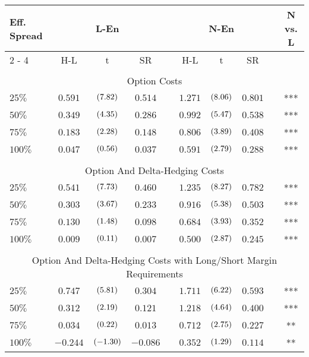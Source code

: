 \begin{tabular}{@{}lccccccccc@{}}%
\toprule%
Eff. Spread&\multicolumn{3}{c}{L{-}En}&&\multicolumn{3}{c}{N{-}En}&&N vs. L\\%
\cmidrule{2%
-%
4}%
\cmidrule{6%
-%
8}%
\multicolumn{1}{c}{}&\multicolumn{1}{c}{H{-}L}&\multicolumn{1}{c}{t}&\multicolumn{1}{c}{SR}&\multicolumn{1}{c}{}&\multicolumn{1}{c}{H{-}L}&\multicolumn{1}{c}{t}&\multicolumn{1}{c}{SR}&\multicolumn{1}{c}{}&\multicolumn{1}{c}{}\\%
\midrule%
&&&&&&&&&\\%
\multicolumn{10}{c}{Option Costs}\\%
\midrule%
$25\%$&$0.591$&$\footnotesize{(7.82)}$&$0.514$&&$1.271$&$\footnotesize{(8.06)}$&$0.801$&&***\\%
$50\%$&$0.349$&$\footnotesize{(4.35)}$&$0.286$&&$0.992$&$\footnotesize{(5.47)}$&$0.538$&&***\\%
$75\%$&$0.183$&$\footnotesize{(2.28)}$&$0.148$&&$0.806$&$\footnotesize{(3.89)}$&$0.408$&&***\\%
$100\%$&$0.047$&$\footnotesize{(0.56)}$&$0.037$&&$0.591$&$\footnotesize{(2.79)}$&$0.288$&&***\\%
&&&&&&&&&\\%
\multicolumn{10}{c}{Option And Delta{-}Hedging Costs}\\%
\midrule%
$25\%$&$0.541$&$\footnotesize{(7.73)}$&$0.460$&&$1.235$&$\footnotesize{(8.27)}$&$0.782$&&***\\%
$50\%$&$0.303$&$\footnotesize{(3.67)}$&$0.233$&&$0.916$&$\footnotesize{(5.38)}$&$0.503$&&***\\%
$75\%$&$0.130$&$\footnotesize{(1.48)}$&$0.098$&&$0.684$&$\footnotesize{(3.93)}$&$0.352$&&***\\%
$100\%$&$0.009$&$\footnotesize{(0.11)}$&$0.007$&&$0.500$&$\footnotesize{(2.87)}$&$0.245$&&***\\%
&&&&&&&&&\\%
\multicolumn{10}{c}{Option And Delta{-}Hedging Costs with Long/Short Margin Requirements}\\%
\midrule%
$25\%$&$0.747$&$\footnotesize{(5.81)}$&$0.304$&&$1.711$&$\footnotesize{(6.22)}$&$0.593$&&***\\%
$50\%$&$0.312$&$\footnotesize{(2.19)}$&$0.121$&&$1.218$&$\footnotesize{(4.64)}$&$0.400$&&***\\%
$75\%$&$0.034$&$\footnotesize{(0.22)}$&$0.013$&&$0.712$&$\footnotesize{(2.75)}$&$0.227$&&**\\%
$100\%$&$-0.244$&$\footnotesize{(-1.30)}$&$-0.086$&&$0.352$&$\footnotesize{(1.29)}$&$0.114$&&**\\\bottomrule%
%
\end{tabular}